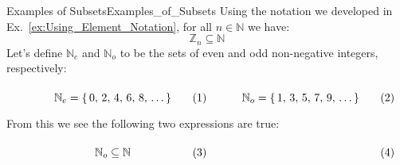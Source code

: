         \begin{fexample}{Examples of Subsets}{Examples_of_Subsets}
            Using the notation we developed in
            Ex.~\ref{ex:Using_Element_Notation}, for all $n\in\mathbb{N}$
            we have:
            \begin{equation}
                \mathbb{Z}_{n}\subseteq\mathbb{N}
            \end{equation}
            Let's define $\mathbb{N}_{e}$ and $\mathbb{N}_{o}$ to be the sets
            of even and odd non-negative integers, respectively:
            \par
            \begin{subequations}
                \begin{minipage}[b]{0.49\textwidth}
                    \begin{equation}
                        \label{eqn:Even_Pos_Ints_Ellipses}%
                        \mathbb{N}_{e}=\{\,0,\,2,\,4,\,6,\,8,\,\dots\,\}
                    \end{equation}
                \end{minipage}
                \hfill
                \begin{minipage}[b]{0.49\textwidth}
                    \begin{equation}
                        \label{eqn:Odd_Pos_Ints_Ellipses}%
                        \mathbb{N}_{o}=\{\,1,\,3,\,5,\,7,\,9,\,\dots\,\}
                    \end{equation}
                \end{minipage}
            \end{subequations}
            \par\vspace{2.5ex}
            From this we see the following two expressions are true:
            \par\hfill\par
            \begin{subequations}
                \begin{minipage}[b]{0.49\textwidth}
                    \begin{equation}
                        \mathbb{N}_{o}\subseteq\mathbb{N}
                    \end{equation}
                \end{minipage}
                \hfill
                \begin{minipage}[b]{0.49\textwidth}
                    \begin{equation}

\end{equation}
\end{minipage}
\end{subequations}
\end{fexample}
